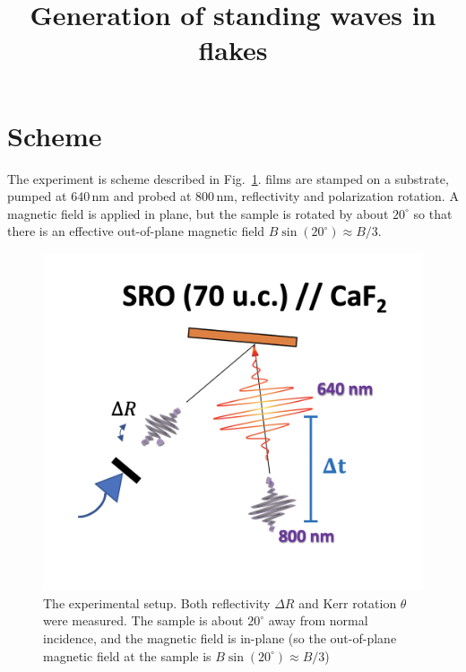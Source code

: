 \documentclass[nobib]{tufte-handout}
\title{Generation of standing waves in \ch{SrRuO3} flakes}
\begin{document}
\maketitle

\section{Scheme}
The experiment is scheme described in Fig.~\ref{fig:setup}.  films are stamped on a  substrate, pumped at \(640\,\mathrm{nm}\) and probed at \(800\,\mathrm{nm}\), reflectivity and polarization rotation. A magnetic field is applied in plane, but the sample is rotated by about \( 20^\circ \) so that there is an effective out-of-plane magnetic field \( B\sin(20^\circ) \approx B/3 \).

\begin{figure}
	\begin{framed}
		\includegraphics[width=\linewidth]{Graphics/setup}
	\end{framed}
	\caption{The experimental setup. Both reflectivity \(\Delta R\) and Kerr rotation \( \theta \) were measured. The sample is about \(20^\circ\) away from normal incidence, and the magnetic field is in-plane (so the out-of-plane magnetic field at the sample is \(B\sin(20^\circ) \approx B/3\))}
	\label{fig:setup}
\end{figure}
\end{document}
